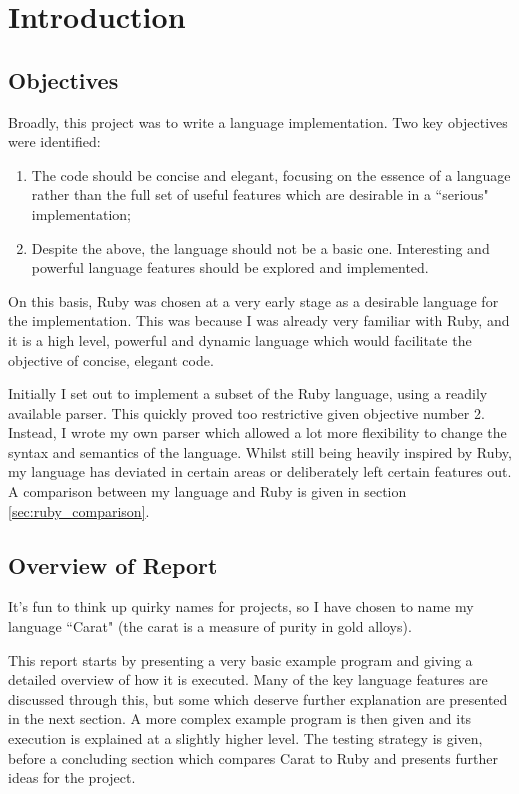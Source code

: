 \section{Introduction}

\subsection{Objectives}

Broadly, this project was to write a language implementation. Two key objectives were identified:

\begin{enumerate}
  \item The code should be concise and elegant, focusing on the essence of a language rather than the full set of useful features which are desirable in a ``serious" implementation;
  \item Despite the above, the language should not be a basic one. Interesting and powerful language features should be explored and implemented.
\end{enumerate}

On this basis, Ruby was chosen at a very early stage as a desirable language for the implementation. This was because I was already very familiar with Ruby, and it is a high level, powerful and dynamic language which would facilitate the objective of concise, elegant code.

Initially I set out to implement a subset of the Ruby language, using a readily available parser. This quickly proved too restrictive given objective number 2. Instead, I wrote my own parser which allowed a lot more flexibility to change the syntax and semantics of the language. Whilst still being heavily inspired by Ruby, my language has deviated in certain areas or deliberately left certain features out. A comparison between my language and Ruby is given in section \ref{sec:ruby_comparison}.

\subsection{Overview of Report}

It's fun to think up quirky names for projects, so I have chosen to name my language ``Carat" (the carat is a measure of purity in gold alloys).

This report starts by presenting a very basic example program and giving a detailed overview of how it is executed. Many of the key language features are discussed through this, but some which deserve further explanation are presented in the next section. A more complex example program is then given and its execution is explained at a slightly higher level. The testing strategy is given, before a concluding section which compares Carat to Ruby and presents further ideas for the project.


